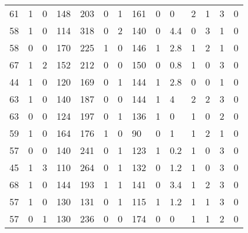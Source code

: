 \documentclass{article}
\begin{document}
\begin{longtable}{|l|l|l|l|l|l|l|l|l|l|l|l|l|l|}
61&1&0&148&203&0&1&161&0&0&2&1&3&0 \\ 
58&1&0&114&318&0&2&140&0&4.4&0&3&1&0 \\ 
58&0&0&170&225&1&0&146&1&2.8&1&2&1&0 \\ 
67&1&2&152&212&0&0&150&0&0.8&1&0&3&0 \\ 
44&1&0&120&169&0&1&144&1&2.8&0&0&1&0 \\ 
63&1&0&140&187&0&0&144&1&4&2&2&3&0 \\ 
63&0&0&124&197&0&1&136&1&0&1&0&2&0 \\ 
59&1&0&164&176&1&0&90&0&1&1&2&1&0 \\ 
57&0&0&140&241&0&1&123&1&0.2&1&0&3&0 \\ 
45&1&3&110&264&0&1&132&0&1.2&1&0&3&0 \\ 
68&1&0&144&193&1&1&141&0&3.4&1&2&3&0 \\ 
57&1&0&130&131&0&1&115&1&1.2&1&1&3&0 \\ 
57&0&1&130&236&0&0&174&0&0&1&1&2&0 \\ 

	\end{longtable}
	
\end{document}
